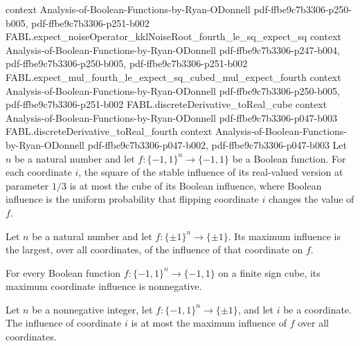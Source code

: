 \begin{theorem}
  {context}
  {Analysis-of-Boolean-Functions-by-Ryan-ODonnell}
  {pdf-ffbe9c7b3306-p250-b005,
    pdf-ffbe9c7b3306-p251-b002}
\proofstep
  {FABL.expect_noiseOperator_kklNoiseRoot_fourth_le_sq_expect_sq}
  {context}
  {Analysis-of-Boolean-Functions-by-Ryan-ODonnell}
  {pdf-ffbe9c7b3306-p247-b004,
    pdf-ffbe9c7b3306-p250-b005,
    pdf-ffbe9c7b3306-p251-b002}
\proofstep
  {FABL.expect_mul_fourth_le_expect_sq_cubed_mul_expect_fourth}
  {context}
  {Analysis-of-Boolean-Functions-by-Ryan-ODonnell}
  {pdf-ffbe9c7b3306-p250-b005,
    pdf-ffbe9c7b3306-p251-b002}
\proofstep
  {FABL.discreteDerivative_toReal_cube}
  {context}
  {Analysis-of-Boolean-Functions-by-Ryan-ODonnell}
  {pdf-ffbe9c7b3306-p047-b003}
\proofstep
  {FABL.discreteDerivative_toReal_fourth}
  {context}
  {Analysis-of-Boolean-Functions-by-Ryan-ODonnell}
  {pdf-ffbe9c7b3306-p047-b002,
    pdf-ffbe9c7b3306-p047-b003}
Let $n$ be a natural number and let $f:\{−1,1\}^n\to\{−1,1\}$ be a Boolean
function. For each coordinate $i$, the square of the stable influence of its real-valued
version at parameter $1/3$ is at most the cube of its Boolean influence, where Boolean
influence is the uniform probability that flipping coordinate $i$ changes the value of
$f$.
\end{theorem}

\begin{definition}
\label{FABL.maximumInfluence}
\leanok
{}
Let $n$ be a natural number and let $f:\{\pm1\}^n\to\{\pm1\}$. Its maximum influence is
the largest, over all coordinates, of the influence of that coordinate on $f$.
\end{definition}

\begin{theorem}
\label{FABL.maximumInfluence_nonneg}
\leanok
{}
For every Boolean function $f:\{-1,1\}^n\to\{-1,1\}$ on a finite sign cube, its maximum
coordinate influence is nonnegative.
\end{theorem}

\begin{theorem}
\label{FABL.booleanInfluence_le_maximumInfluence}
\leanok
{}
Let $n$ be a nonnegative integer, let $f:\{-1,1\}^n\to\{\pm1\}$, and let $i$ be a
coordinate. The influence of coordinate $i$ is at most the maximum influence of $f$ over
all coordinates.
\end{theorem}

